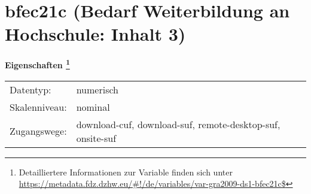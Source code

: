 
    \setcounter{footnote}{0}

    \vspace*{-1.8cm}
	\section{bfec21c (Bedarf Weiterbildung an Hochschule: Inhalt 3)}
	\label{section:bfec21c}



    \vspace*{0.5cm}
    \noindent\textbf{Eigenschaften
	\footnote{Detailliertere Informationen zur Variable finden sich unter
		\url{https://metadata.fdz.dzhw.eu/\#!/de/variables/var-gra2009-ds1-bfec21c$}}}\\
	\begin{tabularx}{\hsize}{@{}lX}
	Datentyp: & numerisch \\
	Skalenniveau: & nominal \\
	Zugangswege: &
	  download-cuf, 
	  download-suf, 
	  remote-desktop-suf, 
	  onsite-suf
 \\
    \end{tabularx}



